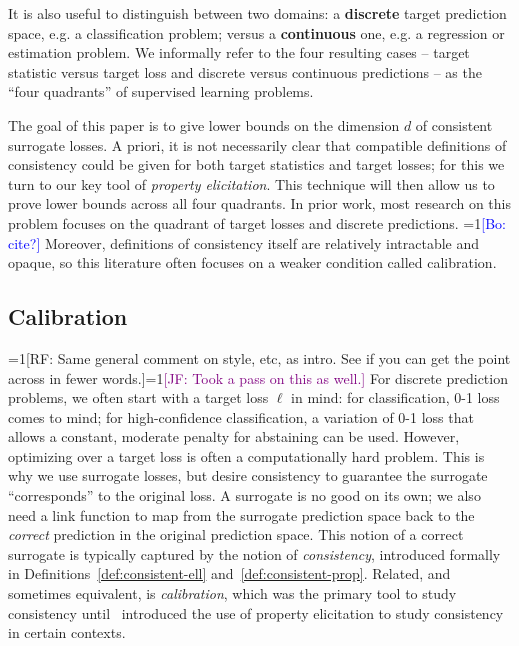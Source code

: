 \documentclass{article}
\newcommand{\Comments}{1}
\newcommand{\mynote}[2]{\ifnum\Comments=1\textcolor{#1}{#2}\fi}
\newcommand{\raf}[1]{\mynote{green!80!blue}{[RF: #1]}}
\newcommand{\jessie}[1]{\mynote{purple}{[JF: #1]}}
\newcommand{\bo}[1]{\mynote{blue}{[Bo: #1]}}
\begin{document}
It is also useful to distinguish between two domains: a \textbf{discrete} target prediction space, e.g. a classification problem; versus a \textbf{continuous} one, e.g. a regression or estimation problem.
We informally refer to the four resulting cases -- target statistic versus target loss and discrete versus continuous predictions -- as the ``four quadrants'' of supervised learning problems.

The goal of this paper is to give lower bounds on the dimension $d$ of consistent surrogate losses.
A priori, it is not necessarily clear that compatible definitions of consistency could be given for both target statistics and target losses; for this we turn to our key tool of \emph{property elicitation}.
This technique will then allow us to prove lower bounds across all four quadrants.
In prior work, most research on this problem focuses on the quadrant of target losses and discrete predictions. \bo{cite?}
Moreover, definitions of consistency itself are relatively intractable and opaque, so this literature often focuses on a weaker condition called calibration.


\subsection{Calibration}\label{subsec:calibration}

\raf{Same general comment on style, etc, as intro.  See if you can get the point across in fewer words.}\jessie{Took a pass on this as well.}
For discrete prediction problems, we often start with a target loss $\ell$ in mind: for classification, 0-1 loss comes to mind; for high-confidence classification, a variation of 0-1 loss that allows a constant, moderate penalty for abstaining can be used.
However, optimizing over a target loss is often a computationally hard problem.
This is why we use surrogate losses, but desire consistency to guarantee the surrogate ``corresponds'' to the original loss.%
A surrogate is no good on its own; we also need a link function to map from the surrogate prediction space back to the \emph{correct} prediction in the original prediction space.
This notion of a correct surrogate is typically captured by the notion of \emph{consistency}, introduced formally in Definitions~\ref{def:consistent-ell} and~\ref{def:consistent-prop}.
Related, and sometimes equivalent, is \emph{calibration}, which was the primary tool to study consistency until~\citet{agarwal2015consistent} introduced the use of property elicitation to study consistency in certain contexts.
\end{document}
